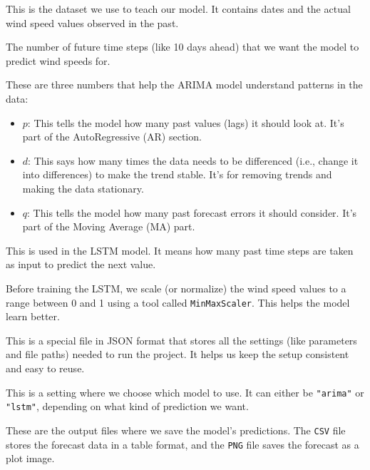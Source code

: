 \begin{description}[style=nextline,leftmargin=3.5cm]
	
	\item[\texttt{train\_data}] 
	This is the dataset we use to teach our model. It contains dates and the actual wind speed values observed in the past.
	
	\item[\texttt{forecast\_steps}] 
	The number of future time steps (like 10 days ahead) that we want the model to predict wind speeds for.
	
	\item[\(p, d, q\)] 
	These are three numbers that help the ARIMA model understand patterns in the data:
	\begin{itemize}
		\item \(p\): This tells the model how many past values (lags) it should look at. It's part of the AutoRegressive (AR) section.
		\item \(d\): This says how many times the data needs to be differenced (i.e., change it into differences) to make the trend stable. It's for removing trends and making the data stationary.
		\item \(q\): This tells the model how many past forecast errors it should consider. It's part of the Moving Average (MA) part.
	\end{itemize}
	
	\item[\texttt{sequence\_length}] 
	This is used in the LSTM model. It means how many past time steps are taken as input to predict the next value.
	
	\item[\texttt{scaler}] 
	Before training the LSTM, we scale (or normalize) the wind speed values to a range between 0 and 1 using a tool called \texttt{MinMaxScaler}. This helps the model learn better.
	
	\item[\texttt{config2.json}] 
	This is a special file in JSON format that stores all the settings (like parameters and file paths) needed to run the project. It helps us keep the setup consistent and easy to reuse.
	
	\item[\texttt{model\_choice}] 
	This is a setting where we choose which model to use. It can either be \texttt{"arima"} or \texttt{"lstm"}, depending on what kind of prediction we want.
	
	\item[\texttt{results\_csv}, \texttt{results\_png}] 
	These are the output files where we save the model's predictions. The \texttt{CSV} file stores the forecast data in a table format, and the \texttt{PNG} file saves the forecast as a plot image.
	
\end{description}

